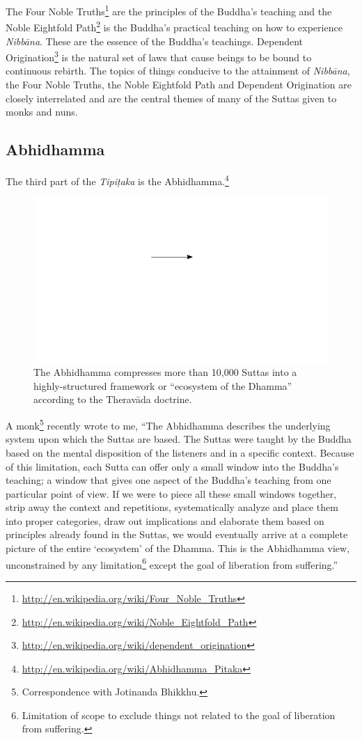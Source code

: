 The Four Noble Truths\footnote{\url{http://en.wikipedia.org/wiki/Four_Noble_Truths}} are the principles of the Buddha’s teaching and the Noble Eightfold Path\footnote{\url{http://en.wikipedia.org/wiki/Noble_Eightfold_Path}} is the Buddha’s practical teaching on how to experience \textit{Nibbāna}. These are the essence of the Buddha’s teachings. Dependent Origination\footnote{\url{http://en.wikipedia.org/wiki/dependent_origination}} is the natural set of laws that cause beings to be bound to continuous rebirth. The topics of things conducive to the attainment of \textit{Nibbāna}, the Four Noble Truths, the Noble Eightfold Path and Dependent Origination are closely interrelated and are the central themes of many of the Suttas given to monks and nuns.

\pagebreak

\subsection*{Abhidhamma}

The third part of the \textit{Tipiṭaka} is the Abhidhamma.\footnote{\url{http://en.wikipedia.org/wiki/Abhidhamma_Pitaka}}

\begin{figure}[h]
\centering
\includegraphics[width=0.25\linewidth]{./Diagrams/Funnel}
\caption{The Abhidhamma compresses more than 10,000 Suttas into a highly-structured framework or “ecosystem of the Dhamma” according to the Theravāda doctrine.}
\label{fig:Funnel}
\end{figure}

A monk\footnote{Correspondence with Jotinanda Bhikkhu.} recently wrote to me, “The Abhidhamma describes the underlying system upon which the Suttas are based. The Suttas were taught by the Buddha based on the mental disposition of the listeners and in a specific context. Because of this limitation, each Sutta can offer only a small window into the Buddha’s teaching; a window that gives one aspect of the Buddha’s teaching from one particular point of view. If we were to piece all these small windows together, strip away the context and repetitions, systematically analyze and place them into proper categories, draw out implications and elaborate them based on principles already found in the Suttas, we would eventually arrive at a complete picture of the entire `ecosystem’ of the Dhamma. This is the Abhidhamma view, unconstrained by any limitation\footnote{Limitation of scope to exclude things not related to the goal of liberation from suffering.} except the goal of liberation from suffering.”

